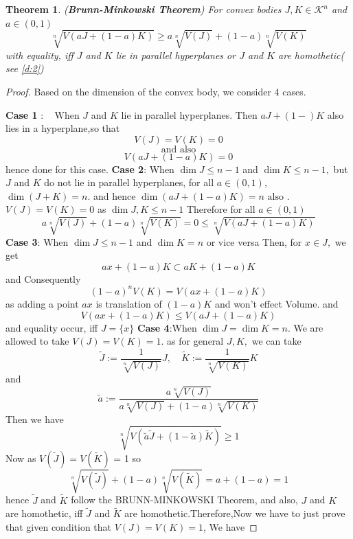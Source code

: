 \documentclass[oneside]{book}
\newtheorem{theorem}{Theorem}[section]
\begin{document}
	\begin{theorem}(\textbf{Brunn-Minkowski Theorem})
		\label{t:11}
		For convex bodies $J, K \in \mathcal{K}^{n}$ and $a \in(0,1)$
		\begin{equation}
		\label{eq54}
		\sqrt[n]{V(a J+(1-a) K)} \geq a \sqrt[n]{V(J)}+(1-a) \sqrt[n]{V(K)}
		\end{equation} \label{eq:4.19}
		with equality, iff $J$ and $K$ lie in parallel hyperplanes or $J$ and $K$ are homothetic( see \ref{d:2})
	\end{theorem}
	\begin{proof}
		Based on the dimension of the convex body, we consider 4 cases.
		\hfill \break
		
		\textbf{Case 1} $: \quad \text{When } J$ and $K$ lie in parallel hyperplanes. Then  $a J+(1-) K$  also lies in a hyperplane,\quad so that $$V(J)=V(K)=0$$    $$\text{and also}$$ $$V(a J+(1-a) K)=0$$
		hence done for this case.
		\hfill \break
		\textbf{Case 2}: \quad  When $\operatorname{dim} J \leq n-1$ and $\operatorname{dim} K \leq n-1,$ but $J$ and $K$ do not lie in parallel hyperplanes, for all $a \in(0,1)$, $\operatorname{dim}(J+K)=n .$ and hence  $\operatorname{dim}(a J+(1-a) K)=n \text{ also }.$ 
		\hfill \break
		$V(J) = V(K)= 0$ as $\operatorname{dim} J,K \leq n-1 $ Therefore for all $a \in(0,1)$
		$$
		a \sqrt[n]{V(J)}+(1-a) \sqrt[n]{V(K)}=0 \leq \sqrt[n]{V(a J+(1-a) K)}
		$$
		\hfill \break
		\textbf{Case 3}: \quad  When $\operatorname{dim } J \leq n-1$ and $\operatorname{dim} K=n$ or vice versa
		\hfill \break 
		Then, for $x \in J,$ we get
		\[
		a x+(1-a) K \subset a K+(1-a) K
		\]
		and Consequently
		\[
		(1-a)^{n} V(K)=V(a x+(1-a) K) 
		\]
		as adding a point $a x $ is translation of $(1-a) K$ and won't effect Volume. 
		and
		$$ V(a x+(1-a) K) \leq V(a 
		J+(1-a) K)$$
		and equality occur, iff $J=\{x\}$ 
		\hfill \break
		\textbf{Case 4}:When $\operatorname{dim} J=\operatorname{dim} K=n .$  We are allowed to take $V(J)=V(K)=1 .$ as for general $J, K,$  we  can take
		\[
		\widetilde{J}:=\frac{1}{\sqrt[n]{V(J)}} J, \quad \widetilde{K}:=\frac{1}{\sqrt[n]{V(K)}} K
		\]
		and
		\[
		\widetilde{a}:=\frac{a \sqrt[n]{V(J)}}{a \sqrt[n]{V(J)}+(1-a) \sqrt[n]{V(K)}}
		\]
		Then we have
		\[
		\sqrt[n]{V({\widetilde{a} \widetilde{ J} }+(1-\widetilde{a}) \widetilde{K})} \geq 1
		\]
		Now  as $V(\widetilde{J}) = V(\widetilde{K})$ = 1 so $$\sqrt[n]{V(\widetilde{J})}+(1-a) \sqrt[n]{V(\widetilde {K})}=a+(1-a)=1$$
		hence $\widetilde{J}$ and $\widetilde{K}$
		follow the BRUNN-MINKOWSKI Theorem,  and also, $J$ and $K$ are homothetic, iff $\widetilde{J}$ and $\widetilde{K}$ are homothetic.Therefore,Now  we have to just prove that given condition that $V(J)=V(K)=1$, We have 

\end{proof}
\end{document}
